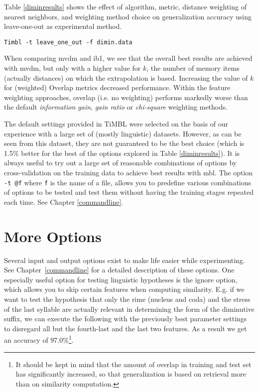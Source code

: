 \documentclass{report}
\begin{document}
Table \ref{diminresults} shows the effect of algorithm, metric,
distance weighting of nearest neighbors, and weighting method choice
on generalization accuracy using leave-one-out as experimental method.

{\small
\begin{verbatim}
Timbl -t leave_one_out -f dimin.data
\end{verbatim}
}

When comparing {\sc mvdm} and {\sc ib1}, we see that the overall best
results are achieved with {\sc mvdm}, but only with a higher value for
$k$, the number of memory items (actually distances) on which the
extrapolation is based. Increasing the value of $k$ for (weighted)
Overlap metrics decreased performance. Within the feature weighting
approaches, overlap (i.e. no weighting) performs markedly worse than
the default {\em information gain}, {\em gain ratio} or {\em
chi-square} weighting methods. 

The default settings provided in TiMBL were selected on the basis of
our experience with a large set of (mostly linguistic)
datasets. However, as can be seen from this dataset, they are not
guaranteed to be the best choice (which is 1.5\% better for the best
of the options explored in Table \ref{diminresults}). It is always
useful to try out a large set of reasonable combinations of options by
cross-validation on the training data to achieve best results with
{\sc mbl}. The option {\tt -t @f} where {\tt f} is the name of a file,
allows you to predefine various combinations of options to be tested
and test them without having the training stages repeated each
time. See Chapter \ref{commandline}.

\section{More Options}

Several input and output options exist to make life easier while
experimenting. See Chapter~\ref{commandline} for a detailed
description of these options. One especially useful option for testing
linguistic hypotheses is the ignore option, which allows you to skip
certain features when computing similarity. E.g. if we want to test
the hypothesis that only the rime (nucleus and coda) and the stress of
the last syllable are actually relevant in determining the form of the
diminutive suffix, we can execute the following with the previously
best parameter settings to disregard all but the fourth-last and the
last two features. As a result we get an accuracy of
97.0\%\footnote{It should be kept in mind that the amount of overlap
in training and test set has significantly increased, so that
generalization is based on retrieval more than on similarity
computation.}. 
\end{document}
